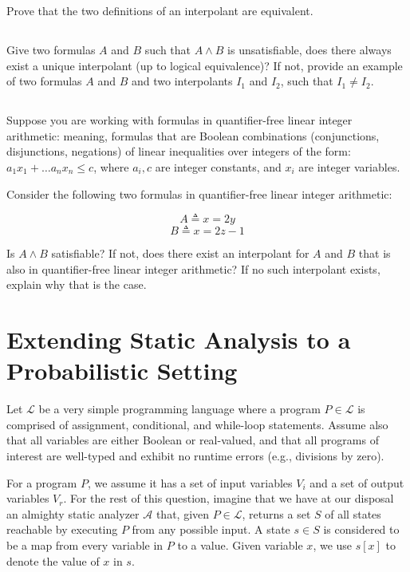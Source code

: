 \documentclass[11pt, oneside]{article}   	%
\begin{document}
Prove that the two definitions of an interpolant are equivalent.

\subsection{}
Give two formulas $A$ and $B$ such that $A\land B$ is unsatisfiable,
does there always exist a unique interpolant (up to logical equivalence)?
If not, provide an example of two formulas $A$ and $B$ and
two interpolants $I_1$ and $I_2$,
such that $I_1 \neq I_2$.


\subsection{}
Suppose you are working with formulas
in quantifier-free linear integer arithmetic:
meaning, formulas that are Boolean combinations (conjunctions, disjunctions, negations)
of linear inequalities over integers
of the form: $a_1x_1 + \ldots a_nx_n \leq c$,
where $a_i,c$ are integer constants, and $x_i$ are integer
variables.

Consider the following two formulas in quantifier-free
linear integer arithmetic:

$$A \triangleq x = 2y$$
$$B \triangleq x = 2z - 1$$

Is $A \land B$ satisfiable?
If not, does there exist an interpolant
for $A$ and $B$ that is also in quantifier-free linear integer arithmetic?
If no such interpolant exists, explain why that is the case.


\section{Extending Static Analysis to a Probabilistic Setting}

\newcommand{\prog}{\mathcal{L}}
\newcommand{\pprog}{\mathcal{L}^\sim}

\newcommand{\stat}{\mathcal{A}}

Let $\prog$ be a very simple programming language
where a program $P \in \prog$ is comprised of assignment,
conditional, and while-loop statements.
Assume also that all variables are either Boolean or real-valued,
and that all programs of interest are well-typed and exhibit
no runtime errors (e.g., divisions by zero).

For a program $P$, we assume it has  a set of input variables $V_i$
and a set of output variables $V_r$.
For the rest of this question, imagine that we have at our
disposal an almighty static analyzer $\stat$ that, given $P \in \prog$,
returns a set $S$ of all states reachable by executing $P$ from
any possible input.
A state $s \in S$ is considered to be a map from every variable
in $P$ to a value.
Given variable $x$, we use $s[x]$ to denote the value of $x$
in $s$.
\end{document}

